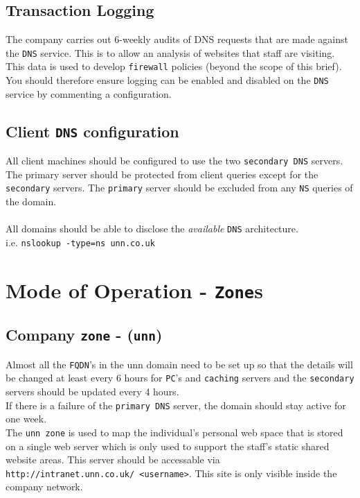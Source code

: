\documentclass[11pt]{article}
\begin{document}
\subsection{Transaction Logging}
The company carries out 6-weekly audits of DNS requests that are made against the \texttt{DNS} service. This is to allow an analysis of websites that staff are 
visiting. This data is used to develop \texttt{firewall} policies (beyond the scope of this brief). You should therefore ensure logging can be enabled and 
disabled on the \texttt{DNS} service by commenting a configuration. 

\subsection{Client \texttt{DNS} configuration}
All client machines should be configured to use the two \texttt{secondary DNS} servers. The primary server should be protected from client queries except for 
the \texttt{secondary} servers. The \texttt{primary} server should be excluded from any \texttt{NS} queries of the domain.\\\\

\noindent All domains should be able to disclose the \textit{available} \texttt{DNS} architecture.\\ 
i.e. \texttt{nslookup -type=ns unn.co.uk}

\section{Mode of Operation - \texttt{Zone}s}

\subsection{Company \texttt{zone} - (\texttt{unn})}
Almost all the \texttt{FQDN}’s in the unn domain need to be set up so that the details will be changed at least every 6 hours for \texttt{PC}’s and 
\texttt{caching} servers and the \texttt{secondary} servers should be updated every 4 hours.\\ 
If there is a failure of the \texttt{primary DNS} server, the domain should stay active for one week.\\

\noindent The \texttt{unn zone} is used to map the individual’s personal web space that is stored on a single web server which is only used to support 
the staff’s static shared website areas. This server should be accessable via \texttt{http://intranet.unn.co.uk/~<username>}. This site is only visible 
inside the company network.\\
\end{document}
